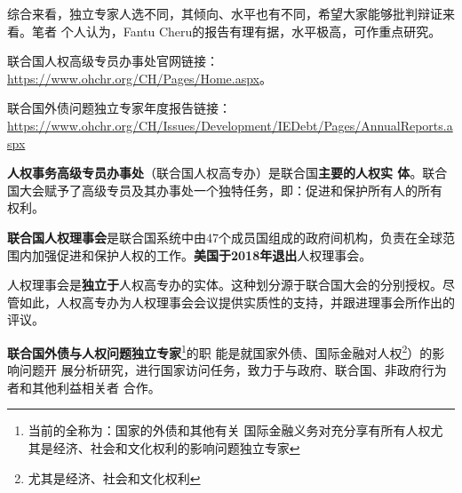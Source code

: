 综合来看，独立专家人选不同，其倾向、水平也有不同，希望大家能够批判辩证来看。笔者
个人认为，Fantu Cheru的报告有理有据，水平极高，可作重点研究。

联合国人权高级专员办事处官网链接：\url{https://www.ohchr.org/CH/Pages/Home.aspx}。

联合国外债问题独立专家年度报告链接：\url{https://www.ohchr.org/CH/Issues/Development/IEDebt/Pages/AnnualReports.aspx}


\textbf{人权事务高级专员办事处}（联合国人权高专办）是联合国\textbf{主要的人权实
  体}。联合国大会赋予了高级专员及其办事处一个独特任务，即：促进和保护所有人的所有
权利。

\textbf{联合国人权理事会}是联合国系统中由47个成员国组成的政府间机构，负责在全球范
围内加强促进和保护人权的工作。\textbf{美国于2018年退出}人权理事会。

人权理事会是\textbf{独立于}人权高专办的实体。这种划分源于联合国大会的分别授权。尽
管如此，人权高专办为人权理事会会议提供实质性的支持，并跟进理事会所作出的评议。

\textbf{联合国外债与人权问题独立专家}\footnote{当前的全称为：国家的外债和其他有关
  国际金融义务对充分享有所有人权尤其是经济、社会和文化权利的影响问题独立专家}的职
能是就国家外债、国际金融对人权\footnote{尤其是经济、社会和文化权利}）的影响问题开
展分析研究，进行国家访问任务，致力于与政府、联合国、非政府行为者和其他利益相关者
合作。


